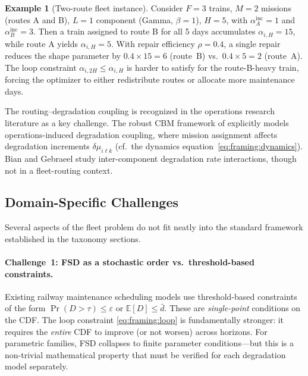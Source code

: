 \documentclass[11pt,a4paper]{article}
\theoremstyle{plain}
\theoremstyle{definition}
\newtheorem{example}[theorem]{Example}
\theoremstyle{remark}
\begin{document}
\begin{example}[Two-route fleet instance]\label{ex:two_route}
Consider $F = 3$ trains, $M = 2$ missions (routes A and B), $L = 1$ component
(Gamma, $\beta = 1$), $H = 5$, with $\alpha^{\mathrm{inc}}_{A} = 1$ and
$\alpha^{\mathrm{inc}}_{B} = 3$. Then a train assigned to route B for all 5
days accumulates $\alpha_{i,H} = 15$, while route A yields $\alpha_{i,H} = 5$.
With repair efficiency $\rho = 0.4$, a single repair reduces the shape parameter
by $0.4 \times 15 = 6$ (route~B) vs.\ $0.4 \times 5 = 2$ (route~A). The loop
constraint $\alpha_{i,2H} \le \alpha_{i,H}$ is harder to satisfy for the
route-B-heavy train, forcing the optimizer to either redistribute routes or
allocate more maintenance days.
\end{example}

The routing--degradation coupling is recognized in the operations research literature
as a key challenge. The robust CBM framework of \cite{robustCBM2023} explicitly models
operations-induced degradation coupling, where mission assignment affects degradation
increments $\delta\mu_{i\ell k}$ (cf.\ the dynamics
equation~\eqref{eq:framing:dynamics}).
Bian and Gebraeel \cite{bian2014} study
inter-component degradation rate interactions, though not in a fleet-routing context.

\subsection{Domain-Specific Challenges}
\label{sec:framing:challenges}

Several aspects of the fleet problem do not fit neatly into the standard framework
established in the taxonomy sections.

\paragraph{Challenge~1: FSD as a stochastic order vs.\ threshold-based constraints.}
Existing railway maintenance scheduling models
\cite{railcarMILP2025,dariano2017,compare2020} use threshold-based constraints of
the form $\Pr(D > \tau) \le \varepsilon$ or $\mathbb{E}[D] \le \bar{d}$.
These are \emph{single-point} conditions on the CDF. The loop constraint
\eqref{eq:framing:loop} is fundamentally stronger: it requires the \emph{entire}
CDF to improve (or not worsen) across horizons. For parametric families,
FSD collapses to finite parameter conditions---but this is a non-trivial
mathematical property that must be verified for each degradation model separately.
\end{document}
